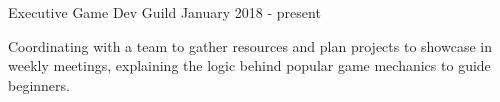 

\begin{cventries}

  \cventry
    {Executive} %
    {Game Dev Guild} %
    {} %
    {January 2018 - present} %
    {
      \begin{cvitems} %
        \item {Coordinating with a team to gather resources and plan projects to showcase in weekly meetings, explaining the logic behind popular game mechanics to guide beginners.}
      \end{cvitems}
    }
\end{cventries}
